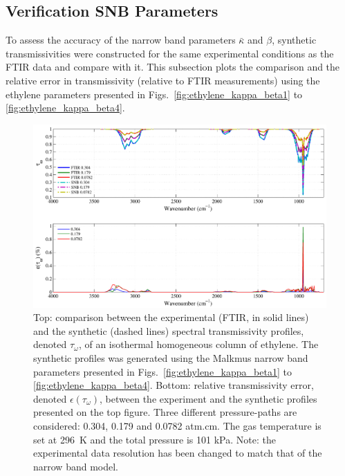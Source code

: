 \subsection{Verification SNB Parameters}

To assess the accuracy of the narrow band parameters $\bar{\kappa}$ and $\beta$, synthetic transmissivities were constructed for the same experimental conditions as the FTIR data and compare with it. This subsection plots the comparison and the relative error in transmissivity (relative to FTIR measurements) using the ethylene parameters presented in Figs.~\ref{fig:ethylene_kappa_beta1} to \ref{fig:ethylene_kappa_beta4}.


\begin{figure}[!h]
\includegraphics[width=\textwidth]{Figures/Comparison_Fit_Ethylene_MALKMUS_Temp296K.pdf}
\caption{Top: comparison between the experimental (FTIR, in solid lines) and the synthetic (dashed lines) spectral transmissivity profiles, denoted $\tau_{\omega}$, of an isothermal homogeneous column of ethylene. The synthetic profiles was generated using the Malkmus narrow band parameters presented in Figs.~\ref{fig:ethylene_kappa_beta1} to \ref{fig:ethylene_kappa_beta4}. Bottom: relative transmissivity error, denoted $\epsilon{(\tau_{\omega})}$, between the experiment and the synthetic profiles presented on the top figure. Three different pressure-paths are considered: 0.304, 0.179 and 0.0782 atm.cm. The gas temperature is set at 296~K and the total pressure is 101 kPa. Note: the experimental data resolution has been changed to match that of the narrow band model. \label{fig:ethylene_SNBVerify_296K}}
\end{figure}

